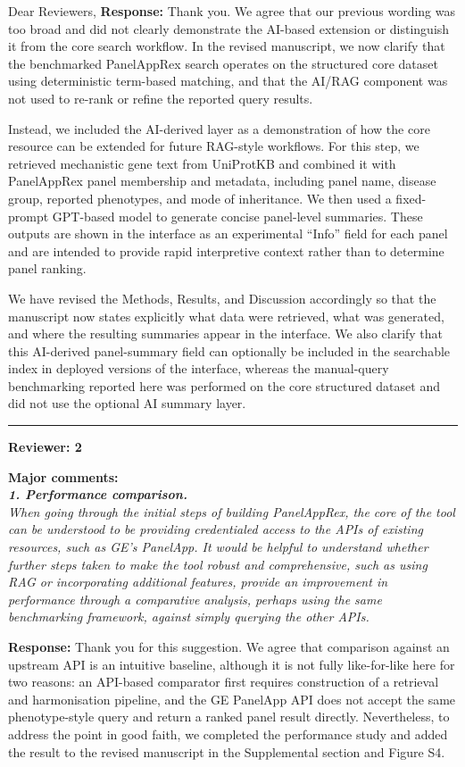 \documentclass[12pt,a4paper]{letter}
\begin{document}
\begin{letter}{Dear Reviewers,}
\textbf{Response:} Thank you. We agree that our previous wording was too broad and did not clearly demonstrate the AI-based extension or distinguish it from the core search workflow. In the revised manuscript, we now clarify that the benchmarked PanelAppRex search operates on the structured core dataset using deterministic term-based matching, and that the AI/RAG component was not used to re-rank or refine the reported query results.

Instead, we included the AI-derived layer as a demonstration of how the core resource can be extended for future RAG-style workflows. For this step, we retrieved mechanistic gene text from UniProtKB and combined it with PanelAppRex panel membership and metadata, including panel name, disease group, reported phenotypes, and mode of inheritance. We then used a fixed-prompt GPT-based model to generate concise panel-level summaries. These outputs are shown in the interface as an experimental ``Info'' field for each panel and are intended to provide rapid interpretive context rather than to determine panel ranking.

We have revised the Methods, Results, and Discussion accordingly so that the manuscript now states explicitly what data were retrieved, what was generated, and where the resulting summaries appear in the interface. We also clarify that this AI-derived panel-summary field can optionally be included in the searchable index in deployed versions of the interface, whereas the manual-query benchmarking reported here was performed on the core structured dataset and did not use the optional AI summary layer.


\noindent\rule{\textwidth}{0.4pt}
\clearpage

\textbf{Reviewer: 2}

\textbf{Major comments:}\\
\textit{\textbf{1. Performance comparison.}\\
When going through the initial steps of building PanelAppRex, the core of the tool can be understood to be providing credentialed access to the APIs of existing resources, such as GE’s PanelApp. It would be helpful to understand whether further steps taken to make the tool robust and comprehensive, such as using RAG or incorporating additional features, provide an improvement in performance through a comparative analysis, perhaps using the same benchmarking framework, against simply querying the other APIs.}

\textbf{Response:} Thank you for this suggestion. We agree that comparison against an upstream API is an intuitive baseline, although it is not fully like-for-like here for two reasons: an API-based comparator first requires construction of a retrieval and harmonisation pipeline, and the GE PanelApp API does not accept the same phenotype-style query and return a ranked panel result directly. Nevertheless, to address the point in good faith, we completed the performance study and added the result to the revised manuscript in the Supplemental section and Figure S4.


\end{letter}
\end{document}
